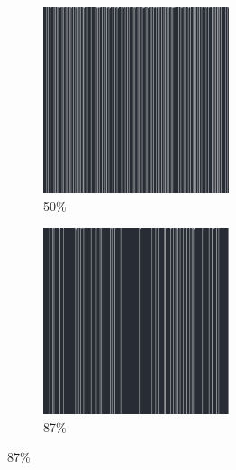 \documentclass[12pt, fleqn]{report}                             %
\theoremstyle{break}                                            %
\begin{document}
\begin{figure}[ht!]
\begin{subfigure}[b]{0.4\linewidth}
          \includegraphics[width=0.6\textwidth]{Images/44/c.png}
          \caption{50\%}
        \end{subfigure}
        \begin{subfigure}[b]{0.4\linewidth}
          \includegraphics[width=0.6\textwidth]{Images/44/d.png}
          \caption{87\%}
        \end{subfigure}
      \end{figure}
\end{document}
